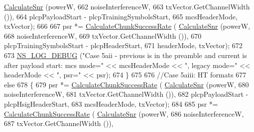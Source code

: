 \begin{DoxyCode}
      \hyperlink{classns3_1_1InterferenceHelper_a8f6192d041874595004c007c5a519b4b}{CalculateSnr} (powerW,
662                                                                   noiseInterferenceW,
663                                                                   txVector.GetChannelWidth ()),
664                                                     plcpPayloadStart - plcpTrainingSymbolsStart,
665                                                     mcsHeaderMode, txVector);
666 
667                   psr *= \hyperlink{classns3_1_1InterferenceHelper_ab1c34c3f7ecef1e37ec778c0cf0e9cef}{CalculateChunkSuccessRate} (
      \hyperlink{classns3_1_1InterferenceHelper_a8f6192d041874595004c007c5a519b4b}{CalculateSnr} (powerW,
668                                                                   noiseInterferenceW,
669                                                                   txVector.GetChannelWidth ()),
670                                                     plcpTrainingSymbolsStart - plcpHeaderStart,
671                                                     headerMode, txVector);
672 
673                   \hyperlink{group__logging_ga413f1886406d49f59a6a0a89b77b4d0a}{NS\_LOG\_DEBUG} (\textcolor{stringliteral}{"Case 5aii - previous is in the preamble and current is after
       payload start: mcs mode="} << mcsHeaderMode << \textcolor{stringliteral}{", legacy mode="} << headerMode << \textcolor{stringliteral}{", psr="} << psr);
674                 \}
675 
676               \textcolor{comment}{//Case 5aiii: HT formats}
677               \textcolor{keywordflow}{else}
678                 \{
679                   psr *= \hyperlink{classns3_1_1InterferenceHelper_ab1c34c3f7ecef1e37ec778c0cf0e9cef}{CalculateChunkSuccessRate} (
      \hyperlink{classns3_1_1InterferenceHelper_a8f6192d041874595004c007c5a519b4b}{CalculateSnr} (powerW,
680                                                                   noiseInterferenceW,
681                                                                   txVector.GetChannelWidth ()),
682                                                     plcpPayloadStart - plcpHsigHeaderStart,
683                                                     mcsHeaderMode, txVector);
684 
685                   psr *= \hyperlink{classns3_1_1InterferenceHelper_ab1c34c3f7ecef1e37ec778c0cf0e9cef}{CalculateChunkSuccessRate} (
      \hyperlink{classns3_1_1InterferenceHelper_a8f6192d041874595004c007c5a519b4b}{CalculateSnr} (powerW,
686                                                                   noiseInterferenceW,
687                                                                   txVector.GetChannelWidth ()),

\end{DoxyCode}
